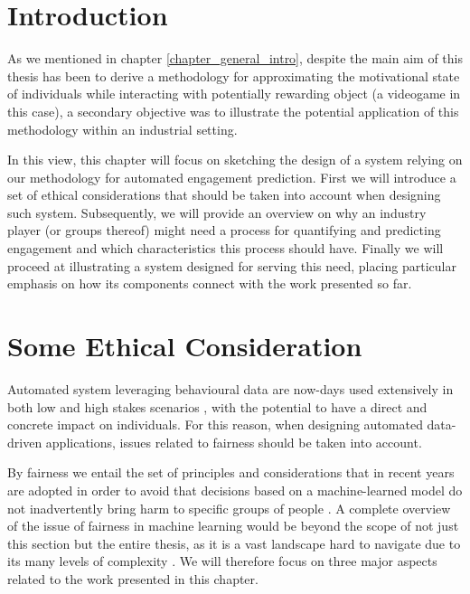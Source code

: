 \section{Introduction}
\label{industry_needs}
As we mentioned in chapter \ref{chapter_general_intro}, despite the main aim of this thesis has been to derive a methodology for approximating the motivational state of individuals while interacting with potentially rewarding object (a videogame in this case), a secondary objective was to illustrate the potential application of this methodology within an industrial setting.

In this view, this chapter will focus on sketching the design of a system relying on our methodology for automated engagement prediction. First we will introduce a set of ethical considerations that should be taken into account when designing such system. Subsequently, we will provide an overview on why an industry player (or groups thereof) might need a process for quantifying and predicting engagement and which characteristics this process should have. Finally we will proceed at illustrating a system designed for serving this need, placing particular emphasis on how its components connect with the work presented so far.

\section{Some Ethical Consideration}
\label{ehtical_considerations}
Automated system leveraging behavioural data are now-days used extensively in both low and high stakes scenarios \cite{mehrabi2021survey}, with the potential to have a direct and concrete impact on individuals. For this reason, when designing automated data-driven applications, issues related to fairness should be taken into account. 

By fairness we entail the set of principles and considerations that in recent years are adopted in order to avoid that decisions based on a machine-learned model do not inadvertently bring harm to specific groups of people \cite{mehrabi2021survey}. A complete overview of the issue of fairness in machine learning would be beyond the scope of not just this section but the entire thesis, as it is a vast landscape \cite{mehrabi2021survey} hard to navigate due to its many levels of complexity \cite{corbett2018measure}.  We will therefore focus on three major aspects related to the work presented in this chapter. 

